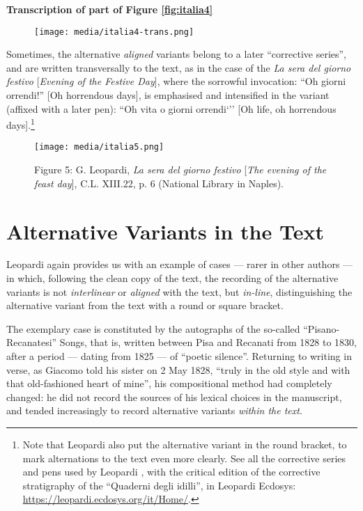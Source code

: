 \documentclass{article}
\begin{document}
\textbf{Transcription of part of Figure \ref{fig:italia4}}

\begin{figure}
    \centering
    \texttt{[image: media/italia4-trans.png]}
\end{figure}

Sometimes, the alternative \emph{aligned} variants belong to a later
``corrective series'', and are written transversally to the text, as in
the case of the \emph{La sera del giorno festivo} [\emph{Evening of the
Festive Day}], where the sorrowful invocation: ``Oh giorni orrendi!'' [Oh
horrendous days], is emphasised and intensified in the variant (affixed
with a later pen): ``Oh vita o giorni orrendi`'' [Oh life, oh horrendous
days].\footnote{Note that Leopardi also put the alternative variant in
  the round bracket, to mark alternations to the text even more
  clearly. See all the corrective series and pens used by Leopardi \parencite{giuffrida_print_2021}, with the critical edition of the
  corrective stratigraphy of the ``Quaderni degli idilli'', in Leopardi
  Ecdosys: \url{https://leopardi.ecdosys.org/it/Home/}.}

\begin{figure}[H]
    \centering
    \texttt{[image: media/italia5.png]}
    \caption{Figure 5: G. Leopardi, \emph{La sera del giorno festivo} [\emph{The
evening of the feast day}], C.L. XIII.22, p. 6 (National Library in
Naples).}
    \label{fig:italia5}
\end{figure}

\section{Alternative Variants in the Text}

Leopardi again provides us with an example of cases –– rarer in other
authors –– in which, following the clean copy of the text, the recording
of the alternative variants is not \emph{interlinear} or \emph{aligned}
with the text, but \emph{in-line}, distinguishing the alternative
variant from the text with a round or square bracket.

The exemplary case is constituted by the autographs of the so-called
``Pisano-Recanatesi'' Songs, that is, written between Pisa and Recanati
from 1828 to 1830, after a period –– dating from 1825 –– of ``poetic
silence''. Returning to writing in verse, as Giacomo told his sister on 2
May 1828, ``truly in the old style and with that old-fashioned heart of
mine'', his compositional method had completely changed: he did not
record the sources of his lexical choices in the manuscript, and tended
increasingly to record alternative variants \emph{within the text}.
\end{document}
